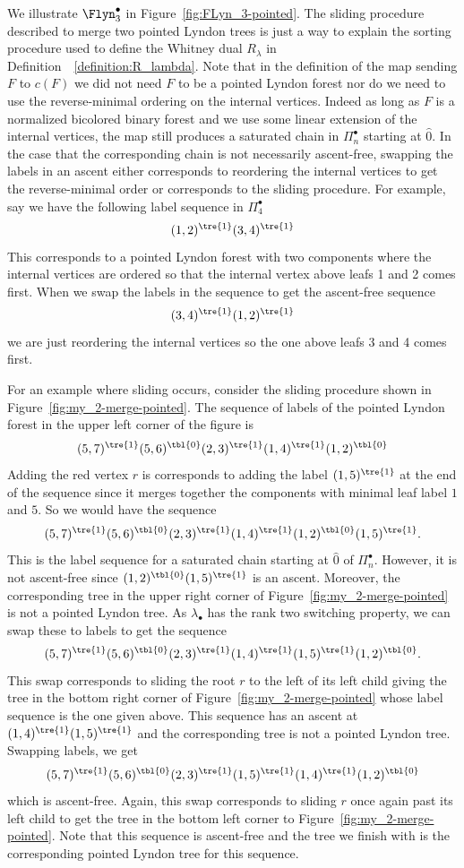 We illustrate $\Flyn_{3}^{\bullet}$ in Figure~\ref{fig:FLyn_3-pointed}.    The sliding procedure described to merge two pointed Lyndon trees is just a way to explain the sorting procedure used to define the Whitney dual $R_\lambda$ in Definition~~\ref{definition:R_lambda}.   Note that in the definition of the map sending $F$ to $c(F)$ we did not need $F$ to be a pointed Lyndon forest nor do we need to use the reverse-minimal ordering on the internal vertices. Indeed as long as $F$ is a normalized bicolored binary forest and we use some linear extension of the internal vertices, the map still produces a saturated chain in $\Pi_n^\bullet$ starting at $\hat{0}$. In the case that the corresponding chain is not necessarily ascent-free, swapping the labels in an ascent either corresponds to reordering the internal vertices to get the reverse-minimal order or corresponds to the sliding procedure.  For example, say we have the following label sequence in $\Pi_4^\bullet$
$$
(1,2)^{\tre{1}}(3,4)^{\tre{1}}
$$
This corresponds to a pointed Lyndon forest with two components where the internal vertices are ordered so that the internal vertex above leafs 1 and 2 comes first.  When we swap the labels in the sequence to get the ascent-free sequence  
$$
(3,4)^{\tre{1}}(1,2)^{\tre{1}}
$$
we are just reordering the internal vertices so the one above leafs 3 and 4  comes first. 

For an example where sliding occurs, consider the sliding procedure shown in Figure~\ref{fig:my_2-merge-pointed}.  The sequence of labels of the pointed Lyndon  forest in the upper left corner of the figure is 
$$
(5,7)^{\tre{1}}(5,6)^{\tbl{0}}(2,3)^{\tre{1}}(1,4)^{\tre{1}}(1,2)^{\tbl{0}}
$$
Adding the red vertex $r$ is corresponds to adding the  label $(1,5)^{\tre{1}}$ at the end of the sequence since it merges together the components with minimal leaf label $1$ and $5$.  So we would have the sequence
$$
(5,7)^{\tre{1}}(5,6)^{\tbl{0}}(2,3)^{\tre{1}}(1,4)^{\tre{1}}(1,2)^{\tbl{0}}(1,5)^{\tre{1}}.
$$
This is the label sequence for a saturated chain starting at $\hat{0}$ of $\Pi_n^\bullet$.  However, it is not ascent-free since $(1,2)^{\tbl{0}}(1,5)^{\tre{1}}$ is an ascent. Moreover, the corresponding tree in the upper right corner of Figure~\ref{fig:my_2-merge-pointed} is not a pointed Lyndon tree. As $\lambda_\bullet$ has the rank two switching property, we can swap these to labels to get the sequence
$$
(5,7)^{\tre{1}}(5,6)^{\tbl{0}}(2,3)^{\tre{1}}(1,4)^{\tre{1}}(1,5)^{\tre{1}}(1,2)^{\tbl{0}}.
$$
This swap corresponds to sliding the root $r$ to the left of its left child giving the tree in the bottom right corner of Figure~\ref{fig:my_2-merge-pointed} whose label sequence is the one given above.  This sequence has an ascent at $(1,4)^{\tre{1}}(1,5)^{\tre{1}}$ and the corresponding tree is not a pointed Lyndon tree. Swapping labels, we  get
$$
(5,7)^{\tre{1}}(5,6)^{\tbl{0}}(2,3)^{\tre{1}}(1,5)^{\tre{1}}(1,4)^{\tre{1}}(1,2)^{\tbl{0}}
$$
which is ascent-free. Again, this swap corresponds to sliding $r$ once again past its left child to get the tree in the bottom left corner to Figure~\ref{fig:my_2-merge-pointed}.  Note that this sequence is ascent-free and the tree we finish with is the corresponding pointed Lyndon tree for this sequence.


